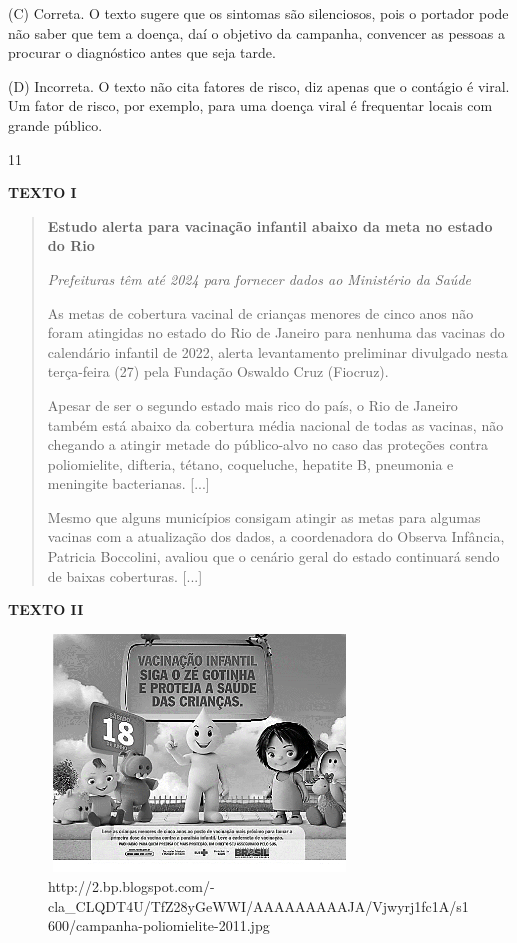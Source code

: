 (C) Correta. O texto sugere que os sintomas são silenciosos, pois o
portador pode não saber que tem a doença, daí o objetivo da campanha,
convencer as pessoas a procurar o diagnóstico antes que seja tarde.

(D) Incorreta. O texto não cita fatores de risco, diz apenas que o
contágio é viral. Um fator de risco, por exemplo, para uma doença viral
é frequentar locais com grande público.

\num{11}

\textbf{TEXTO I}

\begin{quote}
\textbf{Estudo alerta para vacinação infantil abaixo da meta no estado
do Rio}

\emph{Prefeituras têm até 2024 para fornecer dados ao Ministério da
Saúde}

As metas de cobertura vacinal de crianças menores de cinco anos não
foram atingidas no estado do Rio de Janeiro para nenhuma das vacinas do
calendário infantil de 2022, alerta levantamento preliminar divulgado
nesta terça-feira (27) pela Fundação Oswaldo Cruz (Fiocruz).

Apesar de ser o segundo estado mais rico do país, o Rio de Janeiro
também está abaixo da cobertura média nacional de todas as vacinas, não
chegando a atingir metade do público-alvo no caso das proteções contra
poliomielite, difteria, tétano, coqueluche, hepatite B, pneumonia e
meningite bacterianas. {[}...{]}

Mesmo que alguns municípios consigam atingir as metas para algumas
vacinas com a atualização dos dados, a coordenadora do Observa Infância,
Patricia Boccolini, avaliou que o cenário geral do estado continuará
sendo de baixas coberturas. {[}...{]}

\end{quote}

\textbf{TEXTO II}

\begin{figure}
\centering
\includegraphics[width=3.15625in,height=2.48418in]{./imgSAEB_8_POR/media/image32.png}
\caption{http://2.bp.blogspot.com/-cla\_CLQDT4U/TfZ28yGeWWI/AAAAAAAAAJA/Vjwyrj1fc1A/s1600/campanha-poliomielite-2011.jpg}
\end{figure}

